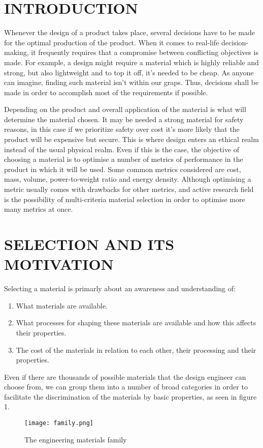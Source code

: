 \documentclass[letterpaper]{article}
\begin{document}
\begin{multicols}{2}
	\section{INTRODUCTION}
	Whenever the design of a product takes place, several decisions have to be made for the optimal production of the product. When it comes to real-life decision-making, it frequently requires that a compromise between conflicting objectives is made. For example, a design might require a material which is highly reliable and strong, but also lightweight and to top it off, it's needed to be cheap. As anyone can imagine, finding such material isn't within our graps. Thus, decisions shall be made in order to accomplish most of the requirements if possible.

	Depending on the product and overall application of the material is what will determine the material chosen. It may be needed a strong material for safety reasons, in this case if we prioritize safety over cost it's more likely that the product will be expensive but secure. This is where design enters an ethical realm instead of the usual physical realm. Even if this is the case, the objective of choosing a material is to optimise a number of metrics of performance in the product in which it will be used. Some common metrics considered are cost, mass, volume, power-to-weight ratio and energy density. Although optimising a metric usually comes with drawbacks for other metrics, and active research field is the possibility of multi-criteria material selection in order to optimise more many metrics at once. \supercite{pasu04}

	\section{SELECTION AND ITS MOTIVATION}
	Selecting a material is primarly about an awareness and understanding of: 
	\begin{enumerate}
		\item What materials are available.
		\item What processes for shaping these materials are available and how this affects their properties.
		\item The cost of the materials in relation to each other, their processing and their properties.
	\end{enumerate}
	Even if there are thousands of possible materials that the design engineer can choose from, we can group them into a number of broad categories in order to facilitate the discrimination of the materials by basic properties, as seen in figure 1.
	\begin{figure}[H]
		\centering
		\texttt{[image: family.png]}
		\caption{The engineering materials family}
	\end{figure}


\end{multicols}
\end{document}
